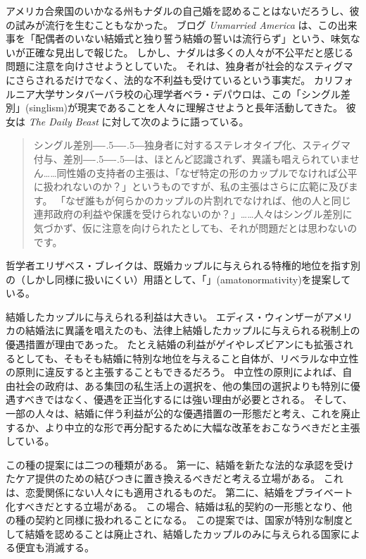 \documentclass[paper=a4,book,openany]{jlreq}
\def\DDASH{―\kern-.5\zw―\kern-.5\zw―}
\begin{document}
アメリカ合衆国のいかなる州もナダルの自己婚を認めることはないだろうし、彼の試みが流行を生むこともなかった。
ブログ \emph{Unmarried America} は、この出来事を「配偶者のいない結婚式と独り誓う結婚の誓いは流行らず」という、味気ないが正確な見出しで報じた\citep{coleman07:_spous_weddin_solo_vows_not_catch}。
しかし、ナダルは多くの人々が不公平だと感じる問題に注意を向けさせようとしていた。
それは、独身者が社会的なスティグマにさらされるだけでなく、法的な不利益も受けているという事実だ。
カリフォルニア大学サンタバーバラ校の心理学者ベラ・デパウロは、この「シングル差別」(singlism)が現実であることを人々に理解させようと長年活動してきた。
彼女は \emph{The Daily Beast} に対して次のように語っている。

\begin{quote}
  シングル差別{\DDASH}独身者に対するステレオタイプ化、スティグマ付与、差別{\DDASH}は、ほとんど認識されず、異議も唱えられていません……同性婚の支持者の主張は、「なぜ特定の形のカップルでなければ公平に扱われないのか？」というものですが、私の主張はさらに広範に及びます。
「なぜ誰もが何らかのカップルの片割れでなければ、他の人と同じ連邦政府の利益や保護を受けられないのか？」……人々はシングル差別に気づかず、仮に注意を向けられたとしても、それが問題だとは思わないのです。
\citep{kelly12:_singl_out}

\end{quote}

哲学者エリザベス・ブレイクは、既婚カップルに与えられる特権的地位を指す別の（しかし同様に扱いにくい）用語として、「」(amatonormativity)を提案している。

結婚したカップルに与えられる利益は大きい\citep[pp.380--381]{sunstein08:_privat_marriag}。
エディス・ウィンザーがアメリカの結婚法に異議を唱えたのも、法律上結婚したカップルに与えられる税制上の優遇措置が理由であった。
たとえ結婚の利益がゲイやレズビアンにも拡張されるとしても、そもそも結婚に特別な地位を与えること自体が、リベラルな中立性の原則に違反すると主張することもできるだろう。
中立性の原則によれば、自由社会の政府は、ある集団の私生活上の選択を、他の集団の選択よりも特別に優遇すべきではなく、優遇を正当化するには強い理由が必要とされる。
そして、一部の人々は、結婚に伴う利益が公的な優遇措置の一形態だと考え、これを廃止するか、より中立的な形で再分配するために大幅な改革をおこなうべきだと主張している。

この種の提案には二つの種類がある。
第一に、結婚を新たな法的な承認を受けたケア提供のための結びつきに置き換えるべきだと考える立場がある。
これは、恋愛関係にない人々にも適用されるものだ。
第二に、結婚をプライベート化すべきだとする立場がある。
この場合、結婚は私的契約の一形態となり、他の種の契約と同様に扱われることになる。
この提案では、国家が特別な制度として結婚を認めることは廃止され、結婚したカップルのみに与えられる国家による便宜も消滅する。
\end{document}
